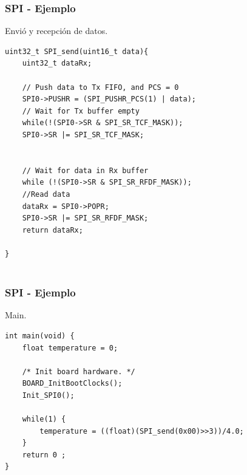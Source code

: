 \documentclass[10.5pt,scale=1.0,t,aspectratio=169,hyperref={pdfpagelabels=false}]{beamer}
\begin{document}
\begin{frame}[fragile]
	\frametitle{SPI - Ejemplo}
	{\small
		Envió y recepción de datos. 
		
		\begin{lstlisting}[style=CStyle]
uint32_t SPI_send(uint16_t data){
	uint32_t dataRx;
	
	// Push data to Tx FIFO, and PCS = 0
	SPI0->PUSHR = (SPI_PUSHR_PCS(1) | data);
	// Wait for Tx buffer empty
	while(!(SPI0->SR & SPI_SR_TCF_MASK));
	SPI0->SR |= SPI_SR_TCF_MASK;
	
	
	// Wait for data in Rx buffer
	while (!(SPI0->SR & SPI_SR_RFDF_MASK));
	//Read data
	dataRx = SPI0->POPR;
	SPI0->SR |= SPI_SR_RFDF_MASK;
	return dataRx;
	
}
		
	\end{lstlisting}	
}
\end{frame}

\begin{frame}[fragile]
	\frametitle{SPI - Ejemplo}
	{\small
		Main. 
		
		\begin{lstlisting}[style=CStyle]
int main(void) {
	float temperature = 0;
	
	/* Init board hardware. */
	BOARD_InitBootClocks();
	Init_SPI0();
	
	while(1) {
		temperature = ((float)(SPI_send(0x00)>>3))/4.0;
	}
	return 0 ;
}
			
		\end{lstlisting}	
	}
\end{frame}
\end{document}
